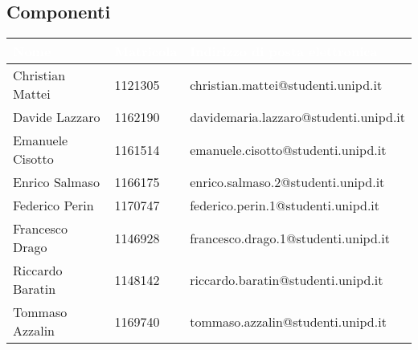 \clearpage
\subsection{Componenti}
{
	\renewcommand{\arraystretch}{2}
	\begin{longtable}{ C{4cm} C{2cm} C{8cm} }
		\textcolor{white}{\textbf{Nome}} & \textcolor{white}{\textbf{Matricola}} & \textcolor{white}{\textbf{Indirizzo di posta elettronica}}\\\endhead	
		
		Christian Mattei & 1121305 & christian.mattei@studenti.unipd.it \\
		Davide Lazzaro & 1162190 & davidemaria.lazzaro@studenti.unipd.it\\
		Emanuele Cisotto & 1161514 & emanuele.cisotto@studenti.unipd.it\\
		Enrico Salmaso & 1166175 & enrico.salmaso.2@studenti.unipd.it \\
		Federico Perin & 1170747 & federico.perin.1@studenti.unipd.it \\
		Francesco Drago & 1146928 & francesco.drago.1@studenti.unipd.it \\
		Riccardo Baratin & 1148142 & riccardo.baratin@studenti.unipd.it \\
		Tommaso Azzalin & 1169740 & tommaso.azzalin@studenti.unipd.it \\
		
		
	\end{longtable}
}